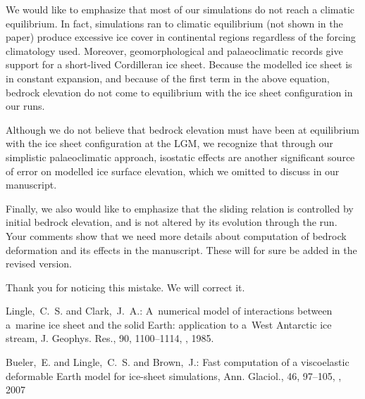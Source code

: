 \documentclass[10pt]{article}
\begin{document}
We would like to emphasize that most of our simulations do not reach a climatic equilibrium. In fact, simulations ran to climatic equilibrium (not shown in the paper) produce excessive ice cover in continental regions regardless of the forcing climatology used. Moreover, geomorphological and palaeoclimatic records give support for a short-lived Cordilleran ice sheet. Because the modelled ice sheet is in constant expansion, and because of the first term in the above equation, bedrock elevation do not come to equilibrium with the ice sheet configuration in our runs.

Although we do not believe that bedrock elevation must have been at equilibrium with the ice sheet configuration at the LGM, we recognize that through our simplistic palaeoclimatic approach, isostatic effects are another significant source of error on modelled ice surface elevation, which we omitted to discuss in our manuscript.

Finally, we also would like to emphasize that the sliding relation is controlled by initial bedrock elevation, and is not altered by its evolution through the run. Your comments show that we need more details about computation of bedrock deformation and its effects in the manuscript. These will for sure be added in the revised version.


Thank you for noticing this mistake. We will correct it.

\begin{thebibliography}{69}

Lingle,~C.~S. and Clark,~J.~A.: A~numerical model of interactions between a~marine ice sheet and the solid Earth: application to a~West Antarctic ice stream, J. Geophys. Res., 90, 1100--1114, , 1985.

Bueler,~E. and Lingle,~C.~S. and Brown,~J.: Fast computation of a viscoelastic deformable Earth model for ice-sheet simulations, Ann. Glaciol., 46, 97--105, , 2007

\end{thebibliography}
\end{document}
